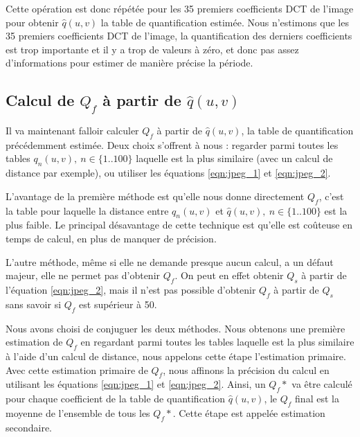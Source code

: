 \documentclass[utf8,final]{stageM2R} %
\begin{document}
Cette opération est donc répétée pour les 35 premiers coefficients DCT de l'image pour obtenir $\widehat{q}(u,v)$ la table de quantification estimée. Nous n'estimons que les 35 premiers coefficients DCT de l'image, la quantification des derniers coefficients est trop importante et il y a trop de valeurs à zéro, et donc pas assez d'informations pour estimer de manière précise la période.

\subsection{Calcul de $Q_f$ à partir de $\widehat{q}(u,v)$}
\label{sec:estimation}
Il va maintenant falloir calculer $Q_f$ à partir de $\widehat{q}(u,v)$, la table de quantification précédemment estimée. Deux choix s'offrent à nous : regarder parmi toutes les tables $q_n(u,v),\ n\in\{1..100\}$ laquelle est la plus similaire (avec un calcul de distance par exemple), ou utiliser les équations \ref{eqn:jpeg_1} et \ref{eqn:jpeg_2}. 

L'avantage de la première méthode est qu'elle nous donne directement $Q_f$, c'est la table pour laquelle la distance entre $q_n(u,v)$ et $\widehat{q}(u,v),\ n\in \{1..100\}$ est la plus faible. Le principal désavantage de cette technique est qu'elle est coûteuse en temps de calcul, en plus de manquer de précision.

L'autre méthode, même si elle ne demande presque aucun calcul, a un défaut majeur, elle ne permet pas d'obtenir $Q_f$. On peut en effet obtenir $Q_s$ à partir de l'équation \ref{eqn:jpeg_2}, mais il n'est pas possible d'obtenir $Q_f$ à partir de $Q_s$ sans savoir si $Q_f$ est supérieur à 50.

Nous avons choisi de conjuguer les deux méthodes. Nous obtenons une première estimation de $Q_f$ en regardant parmi toutes les tables laquelle est la plus similaire à l'aide d'un calcul de distance, nous appelons cette étape l'estimation primaire. Avec cette estimation primaire de $Q_f$, nous affinons la précision du calcul en utilisant les équations \ref{eqn:jpeg_1} et \ref{eqn:jpeg_2}. Ainsi, un $Q_f*$ va être calculé pour chaque coefficient de la table de quantification $\widehat{q}(u,v)$, le $Q_f$ final est la moyenne de l'ensemble de tous les $Q_f*$. Cette étape est appelée estimation secondaire.
\end{document}

